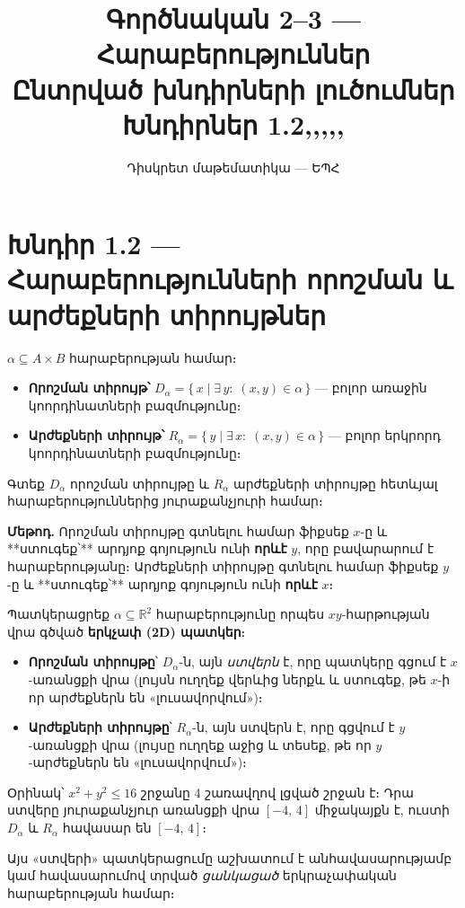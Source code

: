 \documentclass[12pt, a4paper]{article}
\title{\textbf{Գործնական 2--3 — Հարաբերություններ}\\[4pt]
       \large Ընտրված խնդիրների լուծումներ\\[2pt]
       \normalsize Խնդիրներ 1.2,\; 2.1,\; 2.2,\; 3.3,\; 4.1,\; 7.2}
\author{Դիսկրետ մաթեմատիկա — ԵՊՀ}
\date{}
\newcommand{\R}{\mathbb{R}}
\begin{document}
\maketitle
\tableofcontents
\newpage

\section{Խնդիր 1.2 — Հարաբերությունների որոշման և արժեքների տիրույթներ}

\begin{theorybox}
$\alpha \subseteq A \times B$ հարաբերության համար։
\begin{itemize}[nosep]
  \item \textbf{Որոշման տիրույթ՝} $D_\alpha = \{\,x \mid \exists\, y:\; (x,y) \in \alpha\,\}$ — բոլոր առաջին կոորդինատների բազմությունը։
  \item \textbf{Արժեքների տիրույթ՝} $R_\alpha = \{\,y \mid \exists\, x:\; (x,y) \in \alpha\,\}$ — բոլոր երկրորդ կոորդինատների բազմությունը։
\end{itemize}
\end{theorybox}

\begin{problembox}
Գտեք $D_\alpha$ որոշման տիրույթը և $R_\alpha$ արժեքների տիրույթը հետևյալ հարաբերություններից յուրաքանչյուրի համար։
\end{problembox}

\textbf{Մեթոդ.}\; Որոշման տիրույթը գտնելու համար ֆիքսեք $x$-ը և **ստուգեք՝** արդյոք գոյություն ունի \textbf{որևէ} $y$, որը բավարարում է հարաբերությանը։ Արժեքների տիրույթը գտնելու համար ֆիքսեք $y$-ը և **ստուգեք՝** արդյոք գոյություն ունի \textbf{որևէ} $x$։

\medskip

\begin{tcolorbox}[colback=blue!3, colframe=setA!60, arc=2mm, left=5pt, right=5pt, top=4pt, bottom=4pt,
  fonttitle=\bfseries, title={\small Ինտուիցիա. Ստվերի պրոյեկցիայի անալոգիա}]
Պատկերացրեք $\alpha \subseteq \R^2$ հարաբերությունը որպես $xy$-հարթության վրա գծված \textbf{երկչափ (2D) պատկեր}։
\begin{itemize}[nosep]
  \item \textbf{Որոշման տիրույթը}՝ $D_\alpha$-ն, այն \emph{ստվերն} է, որը պատկերը գցում է $x$-առանցքի վրա
        (լույսն ուղղեք վերևից ներքև և ստուգեք, թե $x$-ի որ արժեքներն են «լուսավորվում»)։
  \item \textbf{Արժեքների տիրույթը}՝ $R_\alpha$-ն, այն ստվերն է, որը գցվում է $y$-առանցքի վրա
        (լույսը ուղղեք աջից և տեսեք, թե որ $y$-արժեքներն են «լուսավորվում»)։
\end{itemize}
\smallskip
Օրինակ՝ $x^2 + y^2 \le 16$ շրջանը 4 շառավղով լցված շրջան է։
Դրա ստվերը յուրաքանչյուր առանցքի վրա $[-4,\,4]$ միջակայքն է, ուստի $D_\alpha$ և $R_\alpha$ հավասար են $[-4,\,4]$։

Այս «ստվերի» պատկերացումը աշխատում է անհավասարությամբ կամ հավասարումով տրված \emph{ցանկացած} երկրաչափական հարաբերության համար։
\end{tcolorbox}
\end{document}
